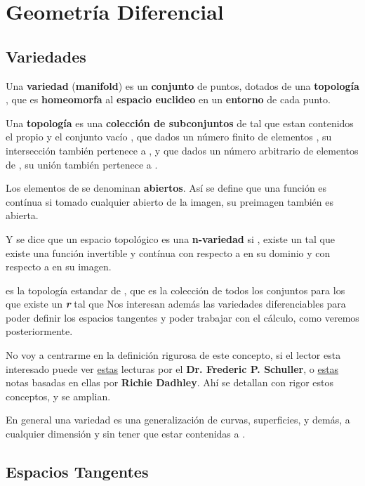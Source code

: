 \section{Geometría Diferencial}
\subsection{Variedades}
\begin{framed}
Una \textbf{variedad} (\textbf{manifold}) es un \textbf{conjunto}  de puntos, dotados de una \textbf{topología} , que es \textbf{homeomorfa} al \textbf{espacio euclideo} en un \textbf{entorno} de cada punto.
\end{framed}

Una \textbf{topología}  es una \textbf{colección de subconjuntos} de  tal que estan contenidos el propio  y  el conjunto vacío \lrg{$\varnothing$}, que dados un número finito de elementos , su intersección también pertenece a , y que dados un número arbitrario de elementos de , su unión también pertenece a .

Los elementos de  se denominan \textbf{abiertos}. Así se define que una función  es contínua si tomado cualquier abierto de la imagen, su preimagen también es abierta.

Y se dice que un espacio topológico es una \textbf{n-variedad} si , existe un  tal que existe una función  invertible y contínua con respecto a  en su dominio y con respecto a  en su imagen.

 es la topología estandar de , que es la colección de todos los conjuntos  para los que  existe un \textbf{\textit{r}} tal que 
\lrg{\[B_r(p)=\left\{p \in R^n \mid \sum^n{(q_i-p_i)^2}<r^2\right\}\]}
Nos interesan además las variedades diferenciables para poder definir los espacios tangentes y poder trabajar con el cálculo, como veremos posteriormente.

No voy a centrarme en la definición rigurosa de este concepto, si el lector esta interesado puede ver \href{https://www.youtube.com/playlist?list=PLFeEvEPtX_0S6vxxiiNPrJbLu9aK1UVC_}{estas} lecturas por el \textbf{Dr. Frederic P. Schuller}, o \href{https://richie291.wixsite.com/theoreticalphysics/post/the-we-heraeus-international-winter-school-on-gravity-and-light}{estas} notas basadas en ellas por \textbf{Richie Dadhley}. Ahí se detallan con rigor estos conceptos, y se amplian.

En general una variedad es una generalización de curvas, superficies, y demás, a cualquier dimensión y sin tener que estar contenidas a .

\break
\subsection{Espacios Tangentes}
